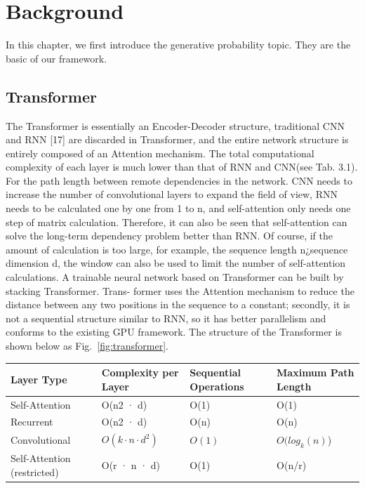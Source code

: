 \chapter{Background}
\label{chap:bg}
In this chapter, we first introduce the generative probability topic.
They are the basic of our framework.

\section{Transformer}
The Transformer is essentially an Encoder-Decoder structure, traditional CNN and RNN [17] are discarded in Transformer, and the entire network structure is entirely composed of an Attention mechanism. The total computational complexity of each layer is much lower than that of RNN and CNN(see Tab. 3.1). For the path length between remote dependencies in the network. CNN needs to increase the number of convolutional layers to expand the field of view, RNN needs to be calculated one by one from 1 to n, and self-attention only needs one step of matrix calculation. Therefore, it can also be seen that self-attention can solve the long-term dependency problem better than RNN. Of course, if the amount of calculation is too large, for example, the sequence length n¿sequence dimension d, the window can also be used to limit the number of self-attention calculations.
A trainable neural network based on Transformer can be built by stacking Transformer. Trans- former uses the Attention mechanism to reduce the distance between any two positions in the sequence to a constant; secondly, it is not a sequential structure similar to RNN, so it has better parallelism and conforms to the existing GPU framework. The structure of the Transformer is shown below as Fig.~\ref{fig:transformer}.

\begin{table}[]
	\begin{tabular}{llll}
		\hline
		Layer Type                  & Complexity per Layer & Sequential Operations & Maximum Path Length \\ \hline
		Self-Attention              & O(n2 · d)            & O(1)                  & O(1)                \\
		Recurrent                   & O(n2 · d)            & O(n)                  & O(n)                \\
		Convolutional               & $O(k\cdot n\cdot d^2)$       & $O(1) $              & $O(log_k(n)$)         \\
		Self-Attention (restricted) & O(r · n · d)         & O(1)                  & O(n/r)              \\ \hline
	\end{tabular}
\label{tab:}
\end{table}

